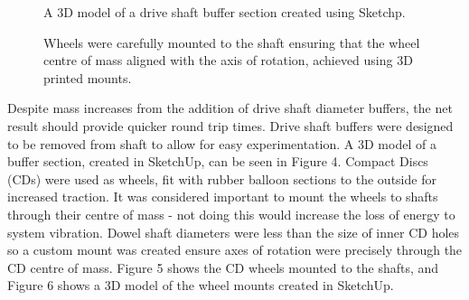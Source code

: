 \documentclass[a4paper]{article}
\begin{document}
\begin{figure}[h]
	\centering
	\begin{minipage}[t]{0.45\textwidth}
		\centering
		\caption{A 3D model of a drive shaft buffer section created using Sketchp.}
	\end{minipage}
	\hspace{1cm}
	\begin{minipage}[t]{0.45\textwidth}
		\centering
		\caption{Wheels were carefully mounted to the shaft ensuring that the wheel centre of mass aligned with the axis of rotation, achieved using 3D printed mounts.}
	\end{minipage}
\end{figure}

Despite mass increases from the addition of drive shaft diameter buffers, the net result should provide quicker round trip times. Drive shaft buffers were designed to be removed from shaft to allow for easy experimentation. A 3D model of a buffer section, created in SketchUp, can be seen in Figure 4. Compact Discs (CDs) were used as wheels, fit with rubber balloon sections to the outside for increased traction. It was considered important to mount the wheels to shafts through their centre of mass - not doing this would increase the loss of energy to system vibration. Dowel shaft diameters were less than the size of inner CD holes so a custom mount was created ensure axes of rotation were precisely through the CD centre of mass. Figure 5 shows the CD wheels mounted to the shafts, and Figure 6 shows a 3D model of the wheel mounts created in SketchUp.\\
\end{document}
